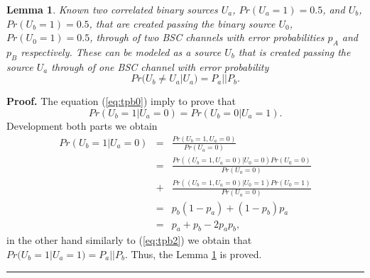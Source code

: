 \documentclass[journal]{IEEEtran}
\newtheorem{lemma}[theorem]{Lemma}
\newenvironment{proof}[1][Proof]{\textbf{#1.} }{\ \rule{0.5em}{0.5em}}
\begin{document}
\begin{lemma}
\label{lemma:twoparbsc}
Known two correlated binary sources $U_a$, $Pr(U_a=1)=0.5$, and $U_b$, 
$Pr(U_b=1)=0.5$, that are created passing the binary 
source $U_0$, $Pr(U_0=1)=0.5$, through of two BSC channels with  error probabilities 
$p_A$ and $p_B$ respectively. These can be modeled as a source $U_b$ that is created 
passing the source $U_a$ through of one BSC channel with  error probability 
\begin{equation} \label{eq:tpb0}
Pr(U_b \neq U_a|U_a)=P_a || P_b.
\end{equation}
\end{lemma}
\begin{proof}
\label{proof:twoparbsc}
The equation (\ref{eq:tpb0}) imply to prove that 
\begin{equation} \label{eq:tpb1}
Pr(U_b=1|U_a=0)=Pr(U_b=0|U_a=1).
\end{equation}
Development both parts we obtain
\tiny
\begin{equation} \label{eq:tpb2}
\begin{matrix}
Pr(U_b=1|U_a=0) & = & \frac{Pr(U_b=1,U_a=0)}{Pr(U_a=0)}\\ 
 ~              & = & \frac{Pr((U_b=1,U_a=0)|U_0=0)Pr(U_0=0)}{Pr(U_a=0)}\\ 
 ~              & + & \frac{Pr((U_b=1,U_a=0)|U_0=1)Pr(U_0=1)}{Pr(U_a=0)}\\
 ~              & = & p_b(1-p_a)+(1-p_b)p_a\\ 
 ~              & = & p_a+p_b -2 p_a p_b,
\end{matrix}
\end{equation}
\normalsize
in the other hand similarly to (\ref{eq:tpb2}) we obtain that 
$Pr(U_b=1|U_a=1)=P_a || P_b$. Thus, the Lemma \ref{lemma:twoparbsc} is proved.
\end{proof}
\end{document}
